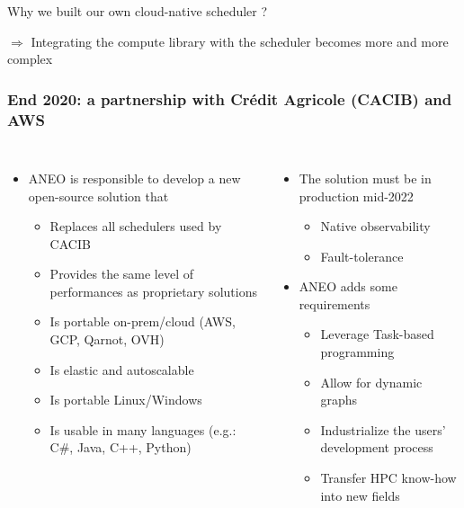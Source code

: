 \documentclass[10pt,aspectratio=1609]{beamer}
\begin{document}
\begin{section}{Why we built our own cloud-native scheduler ?}
\begin{frame}
    $\Rightarrow$ Integrating the compute library with the scheduler becomes more and more complex
  \end{frame}


  \begin{frame}
    \frametitle{End 2020: a partnership with Crédit Agricole (CACIB) and AWS}
    \begin{columns}
      \begin{itemize}
        \item ANEO is responsible to develop a new open-source solution that
        \begin{itemize}
          \item Replaces all schedulers used by CACIB
          \item Provides the same level of performances as proprietary solutions
          \item Is portable on-prem/cloud (AWS, GCP, Qarnot, OVH)
          \item Is elastic and autoscalable
          \item Is portable Linux/Windows
          \item Is usable in many languages (e.g.: C\#, Java, C++, Python)
        \end{itemize}
      \end{itemize}
      \begin{itemize}
        \item The solution must be in production mid-2022
        \begin{itemize}
          \item Native observability
          \item Fault-tolerance
        \end{itemize}
        \item ANEO adds some requirements
        \begin{itemize}
          \item Leverage Task-based programming
          \item Allow for dynamic graphs
          \item Industrialize the users' development process
          \item Transfer HPC know-how into new fields
        \end{itemize}
      \end{itemize}
    \end{columns}
  \end{frame}
  

\end{section}
\end{document}
